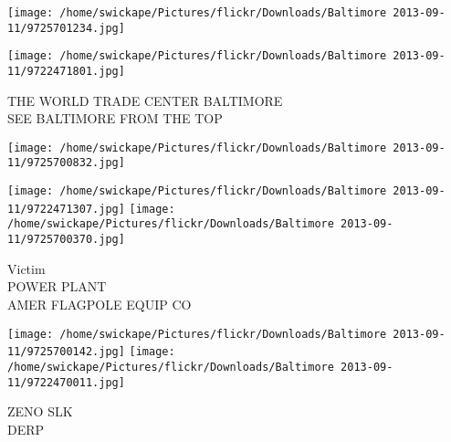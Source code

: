\documentclass[10pt,letterpaper]{article}
\begin{document}
\texttt{[image: /home/swickape/Pictures/flickr/Downloads/Baltimore 2013-09-11/9725701234.jpg]}

\vspace{0.25in}
\texttt{[image: /home/swickape/Pictures/flickr/Downloads/Baltimore 2013-09-11/9722471801.jpg]}

THE WORLD TRADE CENTER BALTIMORE\\
SEE BALTIMORE FROM THE TOP
\pagebreak

\texttt{[image: /home/swickape/Pictures/flickr/Downloads/Baltimore 2013-09-11/9725700832.jpg]}

\vspace{0.25in}
\texttt{[image: /home/swickape/Pictures/flickr/Downloads/Baltimore 2013-09-11/9722471307.jpg]}
\texttt{[image: /home/swickape/Pictures/flickr/Downloads/Baltimore 2013-09-11/9725700370.jpg]}

Victim\\
POWER PLANT\\
AMER FLAGPOLE EQUIP CO
\pagebreak

\texttt{[image: /home/swickape/Pictures/flickr/Downloads/Baltimore 2013-09-11/9725700142.jpg]}
\texttt{[image: /home/swickape/Pictures/flickr/Downloads/Baltimore 2013-09-11/9722470011.jpg]}

ZENO SLK\\
DERP
\pagebreak
\end{document}
